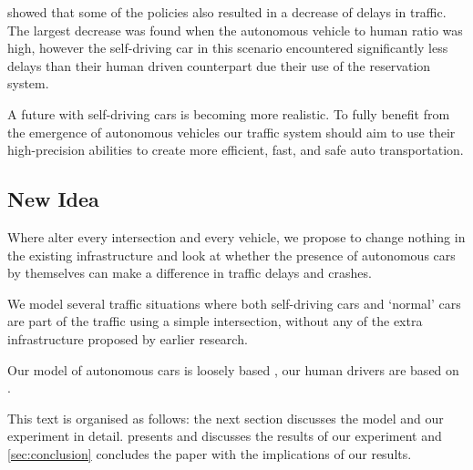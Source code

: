 \textcite{dresner2007sharing} showed that some of the policies also resulted in a decrease of delays in traffic. The largest decrease was found when the autonomous vehicle to human ratio was high, however the self-driving car in this scenario encountered significantly less delays than their human driven counterpart due their use of the reservation system.

A future with self-driving cars is becoming more realistic. To fully benefit from the emergence of autonomous vehicles our traffic system should aim to use their high-precision abilities to create more efficient, fast, and safe auto transportation.


\subsection{New Idea}
\label{sub:intro:new_idea}	
Where \textcite{dresner2007sharing} alter every intersection and every vehicle, we propose to change nothing in the existing infrastructure and look at whether the presence of autonomous cars by themselves can make a difference in traffic delays and crashes. 

We model several traffic situations where both self-driving cars and `normal' cars are part of the traffic using a simple intersection, without any of the extra infrastructure proposed by earlier research. 


Our model of autonomous cars is loosely based \textcite{jiang2010microscopic}, our human drivers are based on \textcite{paruchuri2002multi}.


This text is organised as follows: the next section discusses the model and our experiment in detail.  presents and discusses the results of our experiment and \cref{sec:conclusion} concludes the paper with the implications of our results.